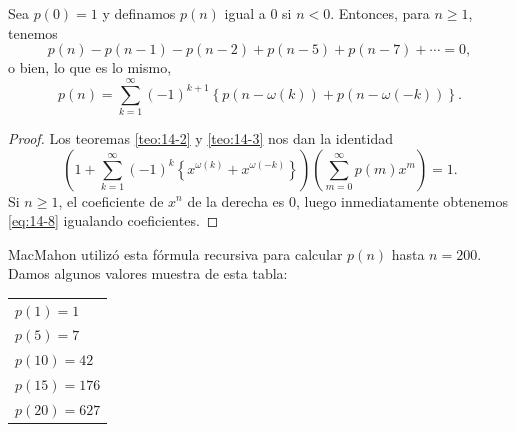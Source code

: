     \begin{teorema}\label{teo:14-4}
        Sea $p(0)=1$ y definamos $p(n)$ igual a 0 si $n<0$. Entonces, para $n\geq1$, tenemos
        \begin{equation}\label{eq:14-8}
            p(n)-p(n-1)-p(n-2)+p(n-5)+p(n-7)+\cdots=0,
        \end{equation}
        o bien, lo que es lo mismo,
        \begin{equation*}
            p(n)=\sum_{k=1}^{\infty}(-1)^{k+1}\left\{p(n-\omega(k))+p(n-\omega(-k))\right\}.
        \end{equation*}
    \end{teorema}

    \begin{proof}
        Los teoremas \ref{teo:14-2} y \ref{teo:14-3} nos dan la identidad
        \begin{equation*}
            \left(1+\sum_{k=1}^{\infty}(-1)^k\left\{x^{\omega(k)}+x^{\omega(-k)}\right\}\right)\left(\sum_{m=0}^{\infty}p(m)x^m\right)=1.
        \end{equation*}
        Si $n\geq1$, el coeficiente de $x^n$ de la derecha es 0, luego inmediatamente
        obtenemos \eqref{eq:14-8} igualando coeficientes.
    \end{proof}

    MacMahon utilizó esta fórmula recursiva para calcular $p(n)$ hasta $n=200$. Damos algunos
    valores muestra de esta tabla:
    \begin{center}
        \begin{tabular}{@{}l@{}}
            $p(1)=1$\\
            $p(5)=7$\\
            $p(10)=42$\\
            $p(15)=176$\\
            $p(20)=627$
        \end{tabular}
    \end{center}

